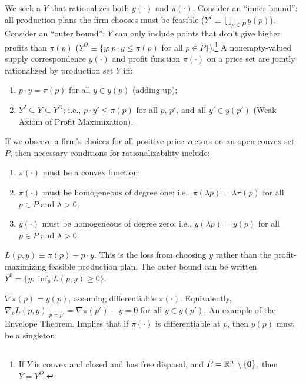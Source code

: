 \documentclass[8pt,letterpaper, landscape]{extarticle} %
\newcommand{\mzero}{\ensuremath{\mathbf{0}}}
\begin{document}
\begin{multicols}{3}
\begin{description}
We seek a $ Y $ that rationalizes both $ y (\cdot) $ and $ \pi (\cdot) $. Consider an ``inner bound'': all production plans the firm chooses must be feasible ($ Y^I \equiv \bigcup_{p \in P} y(p) $). Consider an ``outer bound'': $ Y $ can only include points that don't give higher profits than $ \pi(p) $ ($ Y^O \equiv \{ y \colon p \cdot y \leq \pi(p) $ for all $ p \in P \} $).\footnote{If $ Y $ is convex and closed and has free disposal, and $ P = \R^n_+ \setminus \{ \mzero \} $, then $ Y = Y^O $.} A nonempty-valued supply correspondence $ y (\cdot) $ and profit function $ \pi (\cdot) $ on a price set are jointly rationalized by production set $ Y $ iff:
\begin{enumerate}
\item $ p \cdot y = \pi(p) $ for all $ y \in y(p) $ (adding-up);
\item $ Y^I \subseteq Y \subseteq Y^O $; i.e., $ p \cdot y' \leq \pi(p) $ for all $ p $, $ p' $, and all $ y' \in y(p') $ (Weak Axiom of Profit Maximization).
\end{enumerate}
If we observe a firm's choices for all positive price vectors on an open convex set $ P $, then necessary conditions for rationalizability include:
\begin{enumerate}
\item $ \pi (\cdot) $ must be a convex function;
\item $ \pi (\cdot) $ must be homogeneous of degree one; i.e., $ \pi(\lambda p) = \lambda \pi(p) $ for all $ p \in P $ and $ \lambda > 0 $;
\item $ y (\cdot) $ must be homogeneous of degree zero; i.e., $ y (\lambda p) = y (p) $ for all $ p \in P $ and $ \lambda > 0 $.
\end{enumerate}

 $ L(p,y) \equiv \pi(p) - p \cdot y $. This is the loss from choosing $ y $ rather than the profit-maximizing feasible production plan. The outer bound can be written $ Y^0 = \{ y \colon \inf_{p} L(p,y) \geq 0 \} $.

 $ \nabla \pi(p) = y(p) $, assuming differentiable $ \pi (\cdot) $. Equivalently, $ \nabla_p L(p,y)|_{p=p'} = \nabla \pi(p') - y = 0 $ for all $ y \in y(p') $. An example of the Envelope Theorem. Implies that if $ \pi (\cdot) $ is differentiable at $ p $, then $ y(p) $ must be a singleton.


\end{description}
\end{multicols}
\end{document}
